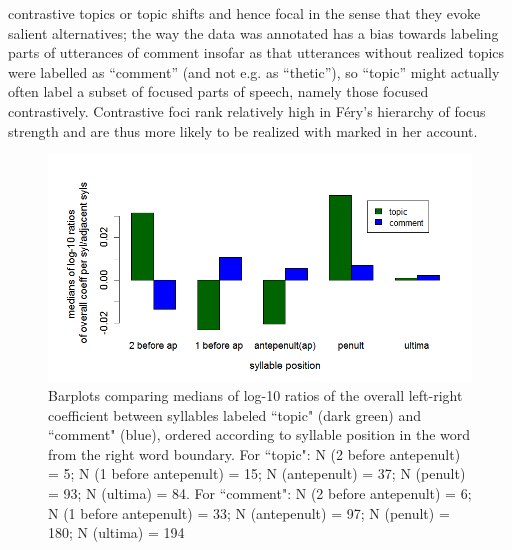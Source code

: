 \documentclass[output=paper]{LSP/langsci}
\begin{document}
contrastive topics or topic shifts and hence focal in the sense that they evoke salient alternatives; the way the data was annotated has a bias towards labeling parts of utterances of comment insofar as that utterances without realized topics were labelled as “comment”  (and not e.g. as “thetic”), so “topic” might actually often label a subset of focused parts of speech, namely those  focused contrastively. Contrastive foci rank relatively high in Féry’s hierarchy of focus strength and are thus more likely to be realized with marked  in her account.   

\begin{figure}
\includegraphics[width=\textwidth]{figures/BUC-img7_new.png}
\caption{Barplots comparing medians of log-10 ratios of the overall left-right coefficient between syllables labeled “topic" (dark green) and “comment" (blue), ordered according to syllable position in the word from the right word boundary. For “topic": N (2 before antepenult) = 5; N (1 before antepenult) = 15; N (antepenult) = 37; N (penult) = 93; N (ultima) = 84. For “comment": N (2 before antepenult) = 6; N (1 before antepenult) = 33; N (antepenult) = 97; N (penult) = 180; N (ultima) = 194
}
\label{fig:buc:7}
\end{figure}



\end{document}
